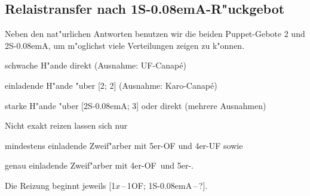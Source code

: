 \documentclass[11pt,german,twocolumn,twoside]{scrartcl}
\def\tr{\Cl\xspace}
\def\sa{\nobreak\textsf{S\kern-0.08emA}\xspace}
\def\ofa{\nobreak\textsf{OF}\xspace}
\def\ufa{\nobreak\textsf{UF}\xspace}
\def\kar{\nobreak\hspace{\cardskip}\Di\xspace}
\def\tre{\nobreak\hspace{\cardskip}\Cl\xspace}
\def\SA{\nobreak\hspace{\cardskip}\sa}
\def\of{\nobreak\hspace{\cardskip}\textsf{OF}\xspace}
\def\any{$x$\xspace}
\def\anybid{\nobreak\hspace{\cardskip}\any}
\def\sep{\,--\,}
\begin{document}
%
%
\subsection{Relaistransfer nach 1\SA-R"uckgebot} \label{1sarebid}

Neben den nat"urlichen Antworten benutzen wir die beiden Puppet-Gebote 2\tre
und 2\SA, um m"oglichst viele Verteilungen zeigen zu k"onnen.

\begin{compactitem}
\item schwache H"ande direkt (Ausnahme: \ufa-Canap\'e)
\item einladende H"ande "uber [2\tre; 2\kar{}] (Ausnahme:
  Karo-Canap\'e)
\item starke H"ande "uber [2\SA; 3\tre{}] oder direkt (mehrere Ausnahmen)
\end{compactitem}

Nicht exakt reizen lassen sich nur
\begin{compactitem}
\item mindestens einladende Zweif"arber mit 5er-\ofa und 4er-\ufa sowie
\item genau einladende Zweif"arber mit 4er-\ofa\ und 5er-\tr.
\end{compactitem}

Die Reizung beginnt jeweils [1\anybid{}\sep1\of; 1\SA{}\sep?].
\end{document}
